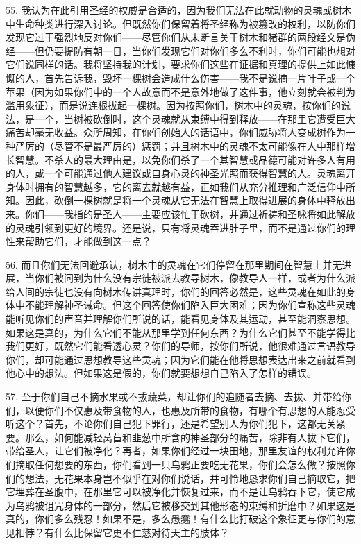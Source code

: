 55. 我认为在此引用圣经的权威是合适的，因为我们无法在此就动物的灵魂或树木中生命种类进行深入讨论。但既然你们保留着将圣经称为被篡改的权利，以防你们发现它过于强烈地反对你们——尽管你们从未断言关于树木和猪群的两段经文是伪经——但仍要提防有朝一日，当你们发现它们对你们多么不利时，你们可能也想对它们说同样的话。我将坚持我的计划，要求你们这些在证据和真理的提供上如此慷慨的人，首先告诉我，毁坏一棵树会造成什么伤害——我不是说摘一片叶子或一个苹果（因为如果你们中的一个人故意而不是意外地做了这件事，他立刻就会被判为滥用象征），而是说连根拔起一棵树。因为按照你们，树木中的灵魂，按你们的说法，是一个，当树被砍倒时，这个灵魂就从束缚中得到释放——在那里它遭受巨大痛苦却毫无收益。众所周知，在你们创始人的话语中，你们威胁将人变成树作为一种严厉的（尽管不是最严厉的）惩罚；并且树木中的灵魂不太可能像在人中那样增长智慧。不杀人的最大理由是，以免你们杀了一个其智慧或品德可能对许多人有用的人，或一个可能通过他人建议或自身心灵的神圣光照而获得智慧的人。灵魂离开身体时拥有的智慧越多，它的离去就越有益，正如我们从充分推理和广泛信仰中所知。因此，砍倒一棵树就是将一个灵魂从它无法在智慧上取得进展的身体中释放出来。你们——我指的是圣人——主要应该忙于砍树，并通过祈祷和圣咏将如此解放的灵魂引领到更好的境界。还是说，只有将灵魂吞进肚子里，而不是通过你们的理性来帮助它们，才能做到这一点？\par

56. 而且你们无法回避承认，树木中的灵魂在它们停留在那里期间在智慧上并无进展，当你们被问到为什么没有宗徒被派去教导树木，像教导人一样，或者为什么派给人间的宗徒也没有向树木传讲真理时，你们的回答必然是，这些灵魂在如此的身体中不能理解神圣诫命。但这个回答使你们陷入巨大困难；因为你们宣称这些灵魂能听见你们的声音并理解你们所说的话，能看见身体及其运动，甚至能洞察思想。如果这是真的，为什么它们不能从那里学到任何东西？为什么它们甚至不能学得比我们更好，既然它们能看透心灵？你们的导师，按你们所说，他很难通过言语教导你们，却可能通过思想教导这些灵魂；因为它们能在他将思想表达出来之前就看到他心中的想法。但如果这是假的，你们就要想想自己陷入了怎样的错误。\par

57. 至于你们自己不摘水果或不拔蔬菜，却让你们的追随者去摘、去拔、并带给你们，以便你们不仅惠及带食物的人，也惠及所带的食物，有哪个有思想的人能忍受听这个？首先，不论你们自己犯下罪行，还是希望别人为你们犯下，这都无关紧要。那么，如何能减轻莴苣和韭葱中所含的神圣部分的痛苦，除非有人拔下它们，带给圣人，让它们被净化？再者，如果你们经过一块田地，那里友谊的权利允许你们摘取任何想要的东西，你们看到一只乌鸦正要吃无花果，你们会怎么做？按照你们的想法，无花果本身岂不似乎在对你们说话，并可怜地恳求你们自己摘取它，把它埋葬在圣腹中，在那里它可以被净化并恢复过来，而不是让乌鸦吞下它，使它成为乌鸦被诅咒身体的一部分，然后它被移交到其他形态的束缚和折磨中？如果这是真的，你们多么残忍！如果不是，多么愚蠢！有什么比打破这个象征更与你们的意见相悖？有什么比保留它更不仁慈对待天主的肢体？\par

